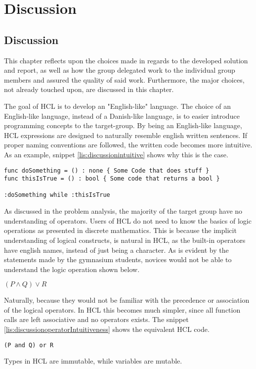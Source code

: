 \chapter{Discussion}
\section{Discussion}
This chapter reflects upon the choices made in regards to the developed solution and report, as well as how the group delegated work to the individual group members and assured the quality of said work.
Furthermore, the major choices, not already touched upon, are discussed in this chapter.

The goal of HCL is to develop an "English-like" language.
The choice of an English-like language, instead of a Danish-like language, is to easier introduce programming concepts to the target-group.
By being an English-like language, HCL expressions are designed to naturally resemble english written sentences.
If proper naming conventions are followed, the written code becomes more intuitive.
As an example, snippet \ref{lis:discussionintuitive} shows why this is the case.

\begin{lstlisting}[language=HCL,label=lis:discussionintuitive,firstnumber=1,caption=Example of the intuitive nature of HCL]
func doSomething = () : none { Some Code that does stuff }
func thisIsTrue = () : bool { Some code that returns a bool }

:doSomething while :thisIsTrue
\end{lstlisting}

As discussed in the problem analysis, the majority of the target group have no understanding of operators.
Users of HCL do not need to know the basics of logic operations as presented in discrete mathematics.
This is because the implicit understanding of logical constructs, is natural in HCL, as the built-in operators have english names, instead of just being a character.
As is evident by the statements made by the gymnasium students, novices would not be able to understand the logic operation shown below.
\begin{center}
	$(P \wedge Q) \vee R$
\end{center}
Naturally, because they would not be familiar with the precedence or association of the logical operators.
In HCL this becomes much simpler, since all function calls are left associative and no operators exists.
The snippet \ref{lis:discussionoperatorIntuitiveness} shows the equivalent HCL code.
\begin{lstlisting}[language=HCL,label=lis:discussionoperatorIntuitiveness,firstnumber=1,caption=Example of the intuitive nature of HCL]
(P and Q) or R
\end{lstlisting}
Types in HCL are immutable, while variables are mutable.

